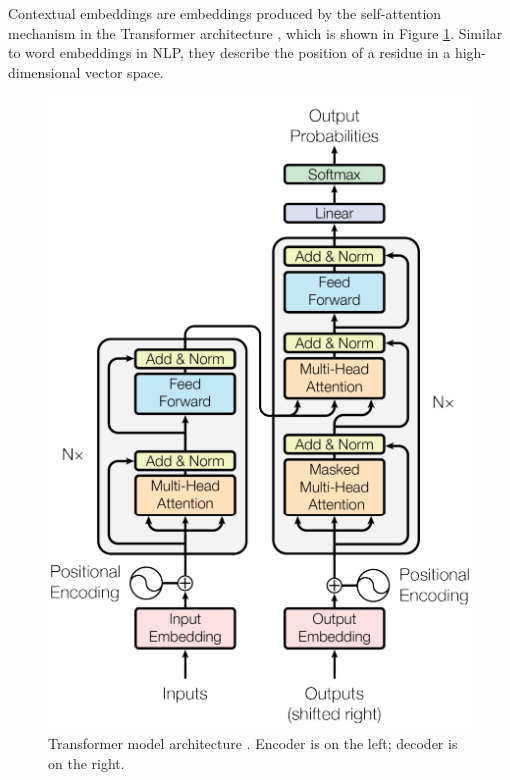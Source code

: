 \documentclass[
	letterpaper, %
	10pt, %
]{journalArticle}
\begin{document}
Contextual embeddings are embeddings produced by the self-attention mechanism in the Transformer architecture \autocite{Vaswani:2017}, which is shown in Figure \ref{fig:transformer}. Similar to word embeddings in NLP, they describe the position of a residue in a high-dimensional vector space.

\begin{figure} %
    \begin{center}
	   \includegraphics[width=0.6\linewidth]{Figures/transformer.png}
    \end{center}
	\caption{Transformer model architecture \autocite{Vaswani:2017}. Encoder is on the left; decoder is on the right.}
    \vspace{-5mm}
	\label{fig:transformer}
\end{figure}
\end{document}
